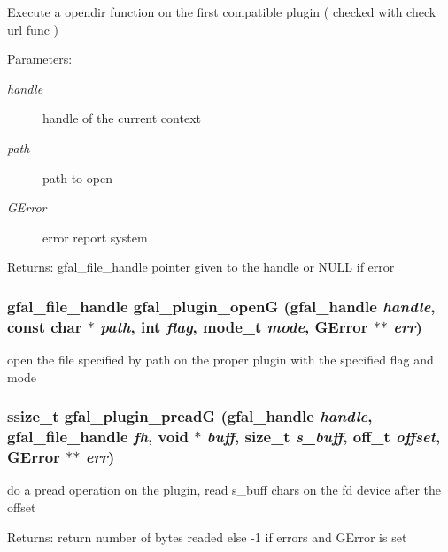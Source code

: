 Execute a opendir function on the first compatible plugin ( checked with check url func ) \begin{Desc}
\item[Parameters:]
\begin{description}
\item[{\em handle}]handle of the current context \item[{\em path}]path to open \item[{\em GError}]error report system \end{description}
\end{Desc}
\begin{Desc}
\item[Returns:]gfal\_\-file\_\-handle pointer given to the handle or NULL if error \end{Desc}
\subsubsection{\setlength{\rightskip}{0pt plus 5cm}gfal\_\-file\_\-handle gfal\_\-plugin\_\-open\-G (gfal\_\-handle {\em handle}, const char $\ast$ {\em path}, int {\em flag}, mode\_\-t {\em mode}, GError $\ast$$\ast$ {\em err})}\label{gfal__common__plugin_8c_322dfbe0ad1e144573719ed08151281e}


open the file specified by path on the proper plugin with the specified flag and mode 
\subsubsection{\setlength{\rightskip}{0pt plus 5cm}ssize\_\-t gfal\_\-plugin\_\-pread\-G (gfal\_\-handle {\em handle}, gfal\_\-file\_\-handle {\em fh}, void $\ast$ {\em buff}, size\_\-t {\em s\_\-buff}, off\_\-t {\em offset}, GError $\ast$$\ast$ {\em err})}\label{gfal__common__plugin_8c_fcf8bb3dbf51a9b85e7ce27542cf928b}


do a pread operation on the plugin, read s\_\-buff chars on the fd device after the offset \begin{Desc}
\item[Returns:]return number of bytes readed else -1 if errors and GError is set \end{Desc}
